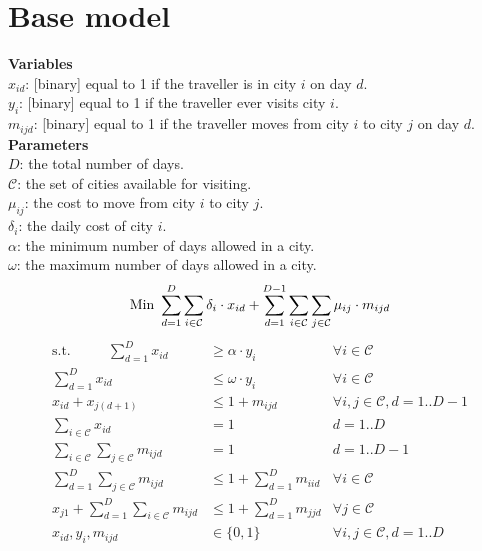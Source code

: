 \documentclass[a4paper]{article}
\begin{document}
\section{Base model}

\textbf{Variables} \\
$x_{id}$: [binary] equal to 1 if the traveller is in city $i$ on day $d$. \\ 	%
$y_{i}$: [binary] equal to 1 if the traveller ever visits city $i$. \\		%
$m_{ijd}$: [binary] equal to 1 if the traveller moves from city $i$ to city $j$ on day $d$. \\	%

\textbf{Parameters}\\
$D$: the total number of days. \\
$\mathcal{C}$: the set of cities available for visiting. \\
$\mu_{ij}$: the cost to move from city $i$ to city $j$. \\
$\delta_{i}$: the daily cost of city $i$. \\
$\alpha$: the minimum number of days allowed in a city. \\
$\omega$: the maximum number of days allowed in a city. \\

\begin{equation*}
\text{Min } \sum_{d=1}^{D} \sum_{i \in \mathcal{C}} \delta_{i} \cdot x_{id} + \sum_{d=1}^{D-1} \sum_{i \in \mathcal{C}} \sum_{j \in \mathcal{C}} \mu_{ij} \cdot m_{ijd}\\
\end{equation*}
\begin{align}
\text{s.t.~~~~~~~~} \sum_{d=1}^{D} x_{id} & \geq \alpha \cdot y_{i} & \forall i \in \mathcal{C}\\
\sum_{d=1}^{D} x_{id} & \leq \omega \cdot y_{i} &  \forall i \in \mathcal{C}\\
x_{id} + x_{j(d+1)} & \leq 1 + m_{ijd} & \forall i,j \in \mathcal{C}, d = 1..D-1 \\
\sum_{i \in \mathcal{C}} x_{id} &= 1 & d = 1..D \\
\sum_{i \in \mathcal{C}} \sum_{j \in \mathcal{C}} m_{ijd} &= 1 & d = 1..D-1 \\
\sum_{d=1}^{D} \sum_{j \in \mathcal{C}} m_{ijd} &\leq 1 + \sum_{d=1}^{D} m_{iid} & \forall i \in \mathcal{C} \\
x_{j1} + \sum_{d=1}^{D} \sum_{i \in \mathcal{C}} m_{ijd} &\leq 1 + \sum_{d=1}^{D} m_{jjd} & \forall j \in \mathcal{C}\\
x_{id}, y_{i}, m_{ijd} & \in \{0,1\} & \forall i, j \in \mathcal{C}, d = 1..D\\
\end{align}
\end{document}
